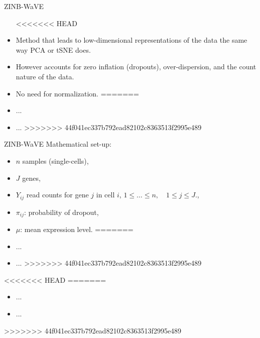 \documentclass{beamer}
\begin{document}
\begin{frame}{ZINB-WaVE}

\begin{itemize}
<<<<<<< HEAD
  \itemsep10pt
  \item Method that leads to low-dimensional representations of the data the same way PCA or tSNE does. \pause
  \item However accounts for zero inflation (dropouts), over-dispersion, and the count nature of the data.
  \item No need for normalization.
=======
  \itemsep12pt
  \item ...
  \item ...
>>>>>>> 44f041ec337b792ead82102c8363513f2995e489
\end{itemize}

\end{frame}




\begin{frame}{ZINB-WaVE}
Mathematical set-up:
\begin{itemize}
<<<<<<< HEAD
  \itemsep10pt
  \item $n$ samples (single-cells),
  \item $J$ genes,
  \item $Y_{ij}$ read counts for gene $j$ in cell $i$, $1\leq \ldots \leq n, \quad 1\leq j \leq J.$,
  \item $\pi_{ij}$: probability of dropout,
  \item $\mu$: mean expression level.
=======
  \itemsep12pt
  \item ...
  \item ...
>>>>>>> 44f041ec337b792ead82102c8363513f2995e489
\end{itemize}

\end{frame}



<<<<<<< HEAD
=======
\begin{itemize}
  \itemsep12pt
  \item ...
  \item ...
\end{itemize}
>>>>>>> 44f041ec337b792ead82102c8363513f2995e489
\end{document}
